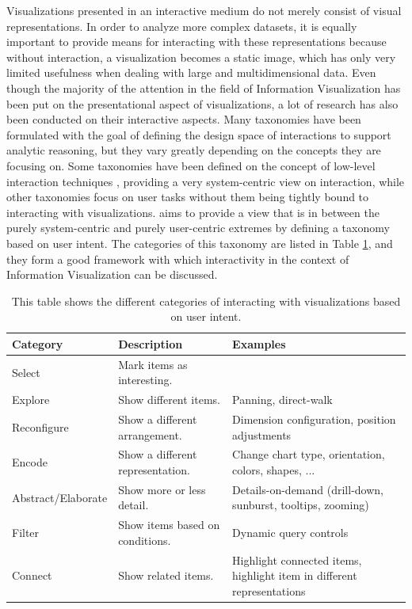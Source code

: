 Visualizations presented in an interactive medium do not merely consist of visual representations. In order to analyze more complex datasets, it is equally important to provide means for interacting with these representations because without interaction, a visualization becomes a static image, which has only very limited usefulness when dealing with large and multidimensional data. Even though the majority of the attention in the field of Information Visualization has been put on the presentational aspect of visualizations, a lot of research has also been conducted on their interactive aspects. Many taxonomies have been formulated with the goal of defining the design space of interactions to support analytic reasoning, but they vary greatly depending on the concepts they are focusing on. Some taxonomies have been defined on the concept of low-level interaction techniques \parencite{TheEyesHaveIt,GrammarOfGraphics}, providing a very system-centric view on interaction, while other taxonomies focus on user tasks \parencite{LowLevelComponentsOfAnalyticActivity} without them being tightly bound to interacting with visualizations. \cite{RoleOfInteractionInInformationVisualization} aims to provide a view that is in between the purely system-centric and purely user-centric extremes by defining a taxonomy based on user intent. The categories of this taxonomy are listed in Table \ref{tab:UserIntentCategories}, and they form a good framework with which interactivity in the context of Information Visualization can be discussed. 

\begin{table}[tp]
    \centering
    \begin{tabularx}{\linewidth}{| l | X | X |}
        \hline
        \textbf{Category} & \textbf{Description} & \textbf{Examples} \\ \hline
        Select & Mark items as interesting. &  \\ \hline
        Explore & Show different items. & Panning, direct-walk  \\ \hline
        Reconfigure & Show a different arrangement. & Dimension configuration, position adjustments \\ \hline
        Encode & Show a different representation. & Change chart type, orientation, colors, shapes, ... \\ \hline
        Abstract/Elaborate & Show more or less detail. & Details-on-demand (drill-down, sunburst, tooltips, zooming)  \\ \hline
        Filter & Show items based on conditions. & Dynamic query controls   \\ \hline
        Connect & Show related items. & Highlight connected items, highlight item in different representations   \\ \hline
        
    \end{tabularx}
    \caption[Categories of Interaction Based on User Intent]
    {
        This table shows the different categories of interacting with visualizations based on user intent.
    }
    \label{tab:UserIntentCategories}
\end{table}

